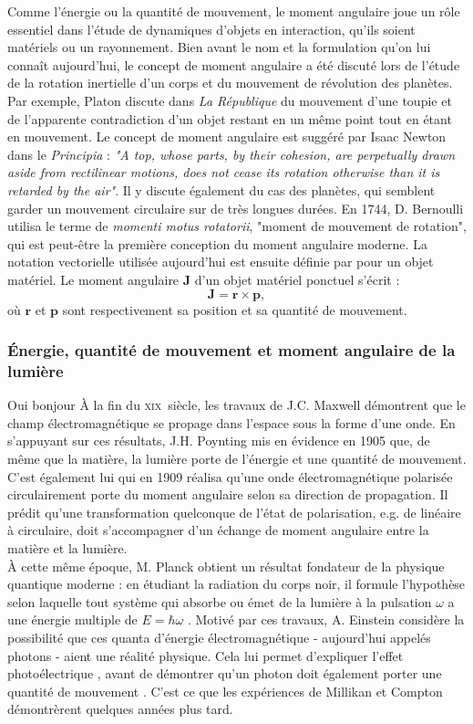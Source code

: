 Comme l'énergie ou la quantité de mouvement, le moment angulaire joue un rôle essentiel dans l'étude de dynamiques d'objets en interaction, qu'ils soient matériels ou un rayonnement. Bien avant le nom et la formulation qu'on lui connaît aujourd'hui, le concept de moment angulaire a été discuté lors de l'étude de la rotation inertielle d'un corps et du mouvement de révolution des planètes. Par exemple, Platon discute dans \textit{La République} du mouvement d'une toupie et de l'apparente contradiction d'un objet restant en un même point tout en étant en mouvement. Le concept de moment angulaire est suggéré par Isaac Newton dans le \textit{Principia} : \textit{"A top, whose parts, by their cohesion, are perpetually drawn aside from rectilinear motions, does not cease its rotation otherwise than it is retarded by the air"}. Il y discute également du cas des planètes, qui semblent garder un mouvement circulaire sur de très longues durées. En 1744, D. Bernoulli utilisa le terme de \textit{momenti motus rotatorii}, "moment de mouvement de rotation", qui est peut-être la première conception du moment angulaire moderne. La notation vectorielle utilisée aujourd'hui est ensuite définie par  pour un objet matériel. Le moment angulaire $\bm{J}$ d'un objet matériel ponctuel s'écrit :
\begin{equation}
\bm{J} = \bm{r}\times\bm{p},
\label{eq:am_matiere}
\end{equation}
où $\bm{r}$ et $\bm{p}$ sont respectivement sa position et sa quantité de mouvement.

\subsubsection{\'Energie, quantité de mouvement et moment angulaire de la lumière}
Oui bonjour
\`A la fin du \textsc{xix}\ieme ~siècle, les travaux de J.C. Maxwell démontrent que le champ électromagnétique se propage dans l'espace sous la forme d'une onde. En s'appuyant sur ces résultats, J.H. Poynting mis en évidence en 1905 que, de même que la matière, la lumière porte de l'énergie et une quantité de mouvement. C'est également lui qui en 1909 réalisa qu'une onde électromagnétique polarisée circulairement porte du moment angulaire selon sa direction de propagation. Il prédit qu'une transformation quelconque de l'état de polarisation, e.g. de linéaire à circulaire, doit s'accompagner d'un échange de moment angulaire entre la matière et la lumière. \\
\`A cette même époque, M. Planck obtient un résultat fondateur de la physique quantique moderne : en étudiant la radiation du corps noir, il formule l'hypothèse selon laquelle tout système qui absorbe ou émet de la lumière à la pulsation $\omega$ a une énergie multiple de $E = \hbar\omega$ . Motivé par ces travaux, A. Einstein considère la possibilité que ces quanta d'énergie électromagnétique - aujourd'hui appelés photons - aient une réalité physique. Cela lui permet d'expliquer l'effet photoélectrique , avant de démontrer qu'un photon doit également porter une quantité de mouvement . C'est ce que les expériences de Millikan et Compton démontrèrent quelques années plus tard. 

